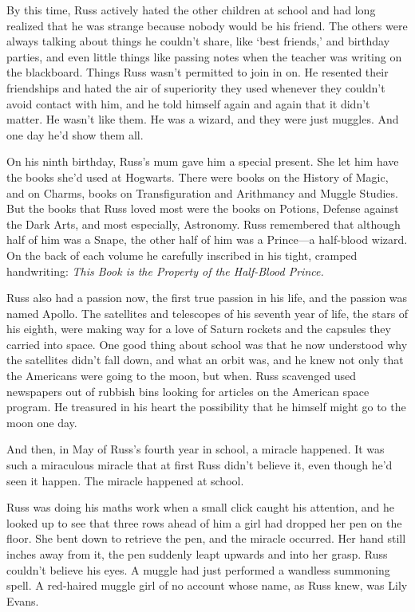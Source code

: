 By this time, Russ actively hated the other children at school and had long realized that he was strange because nobody would be his friend. The others were always talking about things he couldn't share, like `best friends,' and birthday parties, and even little things like passing notes when the teacher was writing on the blackboard. Things Russ wasn't permitted to join in on. He resented their friendships and hated the air of superiority they used whenever they couldn't avoid contact with him, and he told himself again and again that it didn't matter. He wasn't like them. He was a wizard, and they were just muggles. And one day he'd show them all.

On his ninth birthday, Russ's mum gave him a special present. She let him have the books she'd used at Hogwarts. There were books on the History of Magic, and on Charms, books on Transfiguration and Arithmancy and Muggle Studies. But the books that Russ loved most were the books on Potions, Defense against the Dark Arts, and most especially, Astronomy. Russ remembered that although half of him was a Snape, the other half of him was a Prince—a half-blood wizard. On the back of each volume he carefully inscribed in his tight, cramped handwriting: \emph{This Book is the Property of the Half-Blood Prince.}

Russ also had a passion now, the first true passion in his life, and the passion was named Apollo. The satellites and telescopes of his seventh year of life, the stars of his eighth, were making way for a love of Saturn rockets and the capsules they carried into space. One good thing about school was that he now understood why the satellites didn't fall down, and what an orbit was, and he knew not only that the Americans were going to the moon, but when. Russ scavenged used newspapers out of rubbish bins looking for articles on the American space program. He treasured in his heart the possibility that he himself might go to the moon one day.

And then, in May of Russ's fourth year in school, a miracle happened. It was such a miraculous miracle that at first Russ didn't believe it, even though he'd seen it happen. The miracle happened at school.

Russ was doing his maths work when a small click caught his attention, and he looked up to see that three rows ahead of him a girl had dropped her pen on the floor. She bent down to retrieve the pen, and the miracle occurred. Her hand still inches away from it, the pen suddenly leapt upwards and into her grasp. Russ couldn't believe his eyes. A muggle had just performed a wandless summoning spell. A red-haired muggle girl of no account whose name, as Russ knew, was Lily Evans.
